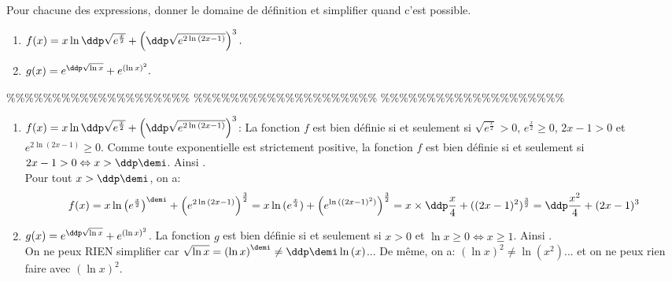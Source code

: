 



\begin{exercice}  \;
Pour chacune des expressions, donner le domaine de d\'efinition et simplifier quand c'est possible.
\begin{enumerate}
\item $f(x)=x\ln{\ddp\sqrt{e^{\frac{x}{2}}}}+\left( \ddp\sqrt{e^{2\ln{(2x-1)}}} \right)^3.$ 
\item $g(x)=e^{\ddp\sqrt{\ln{x}}}+e^{(\ln{x})^2}.$
\end{enumerate}
\end{exercice}


\%\%\%\%\%\%\%\%\%\%\%\%\%\%\%\%\%\%\%\%
\%\%\%\%\%\%\%\%\%\%\%\%\%\%\%\%\%\%\%\%
\%\%\%\%\%\%\%\%\%\%\%\%\%\%\%\%\%\%\%\%



\begin{correction}  \;
\begin{enumerate}
 \item
$f(x)=x\ln{\ddp\sqrt{e^{\frac{x}{2}}}}+\left( \ddp\sqrt{e^{2\ln{(2x-1)}}} \right)^3$: La fonction $f$ est bien d\'efinie si et seulement si $\sqrt{e^{\frac{x}{2}}}>0$, $e^{\frac{x}{2}}\geq 0$, $2x-1>0$ et $e^{2\ln{(2x-1)}}\geq 0$. Comme toute exponentielle est strictement positive, la fonction $f$ est bien d\'efinie si et seulement si $2x-1>0\Leftrightarrow x>\ddp\demi$. Ainsi .\\
\noindent  Pour tout $x>\ddp\demi$, on a: 
$$f(x)=x\ln{  \left( e^{\frac{x}{2}} \right)^{\demi} } + \left( e^{2\ln{(2x-1)}}\right)^{\frac{3}{2}}= x\ln{( e^{\frac{x}{4}} )}  +  \left( e^{\ln{((2x-1)^2)}}\right)^{\frac{3}{2}}= x\times \ddp\frac{x}{4}+ ((2x-1)^2)^{\frac{3}{2}}= \ddp\frac{x^2}{4}+(2x-1)^3$$
\item 
$g(x)=e^{\ddp\sqrt{\ln{x}}}+e^{(\ln{x})^2}$. La fonction $g$ est bien d\'efinie si et seulement si $x>0$ et $\ln{x}\geq 0\Leftrightarrow x\geq 1$. Ainsi .\\
\noindent On ne peux RIEN simplifier car $\sqrt{\ln{x}}=\left( \ln{x} \right)^{\demi}\not= \ddp\demi\ln{(x)}$... De m\^{e}me, on a: $(\ln{x})^2\not= \ln{(x^2)}$... et on ne peux rien faire avec $(\ln{x})^2$.
\end{enumerate}
\end{correction}